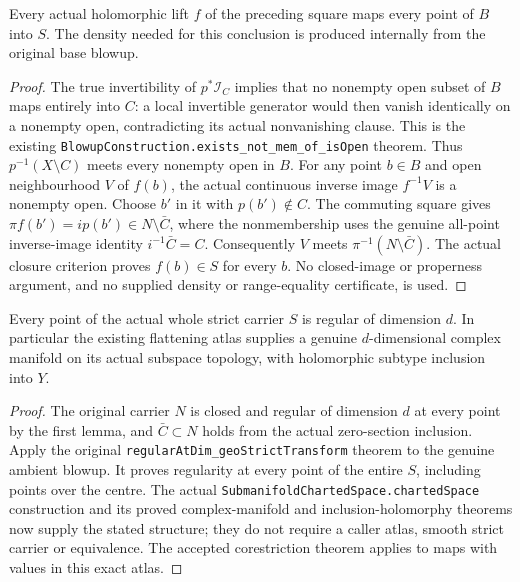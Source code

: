 \begin{lemma}
\label{hir:actual-zero-section-lift-in-whole-strict-carrier}
\leanok
Every actual holomorphic lift $f$ of the preceding square maps every
point of $B$ into $S$. The density needed for this conclusion is produced
internally from the original base blowup.
\end{lemma}
\begin{proof}
The true invertibility of $p^*\mathcal I_C$ implies that no nonempty
open subset of $B$ maps entirely into $C$: a local invertible generator
would then vanish identically on a nonempty open, contradicting its
actual nonvanishing clause. This is the existing
\texttt{BlowupConstruction.exists\_not\_mem\_of\_isOpen} theorem.
Thus $p^{-1}(X\setminus C)$ meets every nonempty open in $B$.
For any point $b\in B$ and open neighbourhood $V$ of $f(b)$, the actual
continuous inverse image $f^{-1}V$ is a nonempty open. Choose $b'$ in it
with $p(b')\notin C$. The commuting square gives
$\pi f(b')=i p(b')\in N\setminus\bar C$, where the nonmembership uses
the genuine all-point inverse-image identity $i^{-1}\bar C=C$.
Consequently $V$ meets $\pi^{-1}(N\setminus\bar C)$. The actual closure
criterion proves $f(b)\in S$ for every $b$. No closed-image or properness
argument, and no supplied density or range-equality certificate, is used.
\end{proof}

\begin{theorem}
\label{hir:actual-zero-section-strict-carrier-manifold}
\leanok
Every point of the actual whole strict carrier $S$ is regular of dimension
$d$. In particular the existing flattening atlas supplies a genuine
$d$-dimensional complex manifold on its actual subspace topology, with
holomorphic subtype inclusion into $Y$.
\end{theorem}
\begin{proof}
The original carrier $N$ is closed and regular of dimension $d$ at every
point by the first lemma, and $\bar C\subset N$ holds from the actual
zero-section inclusion. Apply the original
\texttt{regularAtDim\_geoStrictTransform} theorem to the genuine ambient
blowup. It proves regularity at every point of the entire $S$, including
points over the centre. The actual
\texttt{SubmanifoldChartedSpace.chartedSpace} construction and its proved
complex-manifold and inclusion-holomorphy theorems now supply the stated
structure; they do not require a caller atlas, smooth strict carrier or
equivalence. The accepted corestriction theorem applies to maps with values
in this exact atlas.
\end{proof}

